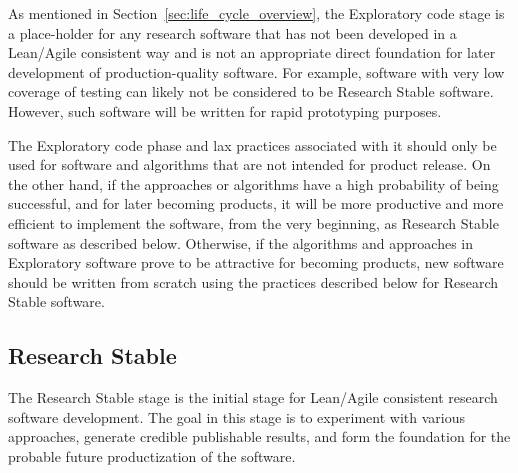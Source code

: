 \documentclass[11pt]{SANDreport}
\begin{document}
As mentioned in Section~\ref{sec:life_cycle_overview}, the Exploratory
code stage is a place-holder for any research software that has not
been developed in a Lean/Agile consistent way and is not an
appropriate direct foundation for later development of
production-quality software.  For example, software with very low
coverage of testing can likely not be considered to be Research Stable
software.  However, such software will be written for rapid
prototyping purposes.

The Exploratory code phase and lax practices associated with it should
only be used for software and algorithms that are not intended for
product release.  On the other hand, if the approaches or algorithms
have a high probability of being successful, and for later becoming
products, it will be more productive and more efficient to implement
the software, from the very beginning, as Research Stable software as
described below.  Otherwise, if the algorithms and approaches in
Exploratory software prove to be attractive for becoming products, new
software should be written from scratch using the practices described
below for Research Stable software.


%
{}\subsection{Research Stable}
\label{sec:research_stable_code}
%

The Research Stable stage is the initial stage for Lean/Agile
consistent research software development.  The goal in this stage is
to experiment with various approaches, generate credible publishable
results, and form the foundation for the probable future
productization of the software.
\end{document}
